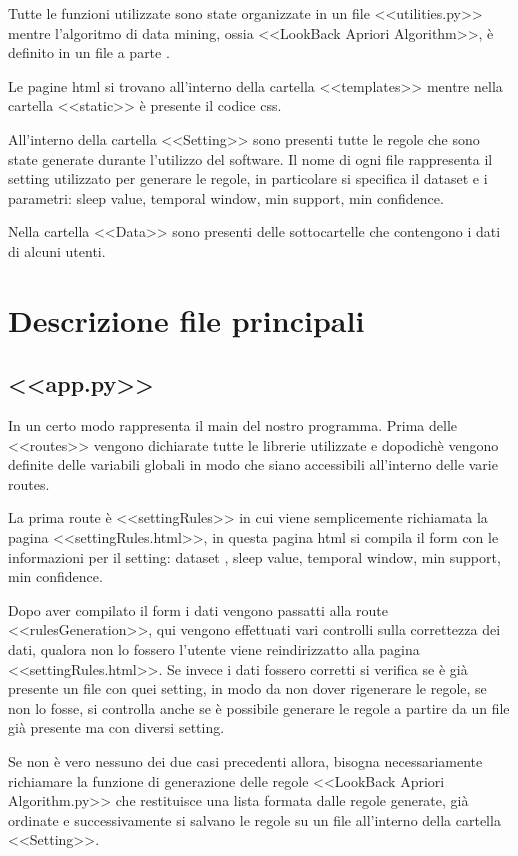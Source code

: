\documentclass{article}
\begin{document}
Tutte le funzioni utilizzate sono state organizzate in un file <<utilities.py>> mentre l'algoritmo di data mining, ossia <<LookBack Apriori Algorithm>>, è definito in un file a parte .

Le pagine html si trovano all'interno della cartella <<templates>> mentre nella cartella <<static>> è presente il codice css.

All'interno della cartella <<Setting>> sono presenti tutte le regole che sono state generate durante l'utilizzo del software. Il nome di ogni file rappresenta il setting utilizzato per generare le regole, in particolare si specifica il dataset  e i parametri:  sleep value, temporal window, min support, min confidence.

Nella cartella <<Data>> sono presenti delle sottocartelle che contengono i dati di alcuni utenti.

\section{Descrizione file principali}
\subsection{<<app.py>>}
In un certo modo rappresenta il main del nostro programma.
Prima delle <<routes>> vengono dichiarate tutte le librerie  utilizzate e dopodichè vengono definite delle variabili globali in modo che siano accessibili all'interno delle varie routes.

La prima route è <<settingRules>> in cui viene semplicemente richiamata la pagina <<settingRules.html>>, in questa pagina html si compila il form con le informazioni per il setting: dataset , sleep value, temporal window, min support, min confidence. 

Dopo aver compilato il form i dati vengono passatti alla route <<rulesGeneration>>, qui vengono effettuati vari controlli sulla correttezza dei dati, qualora non lo fossero l'utente viene reindirizzatto alla pagina <<settingRules.html>>. Se invece i dati fossero corretti si verifica se è già presente un file con quei  setting, in modo da non dover rigenerare le regole, se non lo fosse, si controlla anche se è possibile generare le regole a partire da un file già presente ma con diversi setting.

 Se non è vero nessuno dei due casi precedenti allora, bisogna necessariamente  richiamare la funzione di generazione delle regole <<LookBack Apriori Algorithm.py>> che restituisce una lista formata dalle regole generate, già ordinate e successivamente si salvano le regole su un file all'interno della cartella <<Setting>>.
\end{document}
